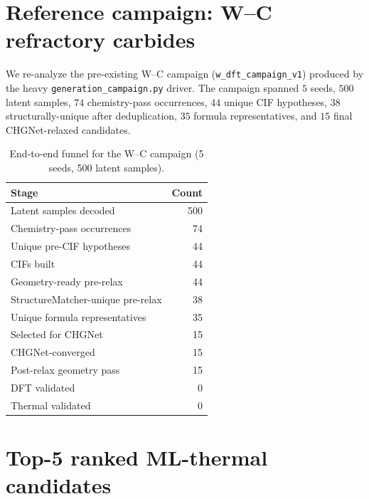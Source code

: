 \documentclass[11pt,a4paper]{report}
\begin{document}
\section{Reference campaign: W--C refractory carbides}

We re-analyze the pre-existing W--C campaign
(\texttt{w\_dft\_campaign\_v1}) produced by the heavy \texttt{generation\_campaign.py}
driver. The campaign spanned $5$ seeds, $500$ latent samples, $74$ chemistry-pass occurrences,
$44$ unique CIF hypotheses, $38$ structurally-unique after deduplication, $35$ formula
representatives, and $15$ final CHGNet-relaxed candidates.

\begin{table}[h]
\centering
\caption{End-to-end funnel for the W--C campaign (5 seeds, 500 latent samples).}
\label{tab:funnel}
\begin{tabular}{lr}
\toprule
\textbf{Stage} & \textbf{Count} \\
\midrule
Latent samples decoded & 500 \\
Chemistry-pass occurrences & 74 \\
Unique pre-CIF hypotheses & 44 \\
CIFs built & 44 \\
Geometry-ready pre-relax & 44 \\
StructureMatcher-unique pre-relax & 38 \\
Unique formula representatives & 35 \\
Selected for CHGNet & 15 \\
CHGNet-converged & 15 \\
Post-relax geometry pass & 15 \\
\midrule
DFT validated & 0 \\
Thermal validated & 0 \\
\bottomrule
\end{tabular}
\end{table}

\section{Top-5 ranked ML-thermal candidates}
\end{document}
